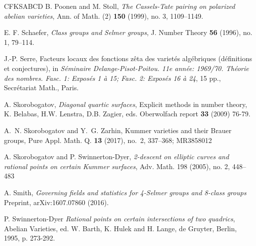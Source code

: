 \documentclass[10pt]{amsart}
\numberwithin{equation}{section}
\theoremstyle{remark}
\theoremstyle{definition}
\theoremstyle{definition}
\theoremstyle{definition}
\theoremstyle{definition}
\theoremstyle{definition}
\theoremstyle{definition}
\theoremstyle{definition}
\theoremstyle{definition}
\begin{document}
\begin{thebibliography}{CFKSABCD}
  B. Poonen and M. Stoll,  \textit{The {C}assels-{T}ate pairing on polarized abelian varieties}, Ann. of Math. (2) \textbf{150} (1999), no. 3, 1109--1149.
  
E. F. Schaefer, \textit{Class groups and {S}elmer groups}, J. Number Theory \textbf{56} (1996), no. 1, 79--114.

 J.-P. Serre, Facteurs locaux des fonctions z\^eta des variet\'es alg\'ebriques (d\'efinitions et conjectures), in {\it S\'eminaire Delange-Pisot-Poitou. 11e ann\'ee: 1969/70. Th\'eorie des nombres. Fasc. 1: Expos\'es 1 \`a{} 15; Fasc. 2: Expos\'es 16 \`a{} 24}, 15 pp., Secr\'etariat Math., Paris.
  
A.  Skorobogatov, \textit{Diagonal quartic surfaces}, Explicit methods in number theory, K. Belabas, H.W. Lenstra, D.B. Zagier, eds. Oberwolfach report \textbf{33} (2009) 76-79. 

 A.~N. Skorobogatov and Y.~G. Zarhin, Kummer varieties and their Brauer groups, Pure Appl. Math. Q. {\bf 13} (2017), no.~2, 337--368; MR3858012
  
A.  Skorobogatov and P.  Swinnerton-Dyer, \textit{2-descent on elliptic curves and rational points on certain Kummer surfaces}, Adv. Math. 198 (2005), no. 2, 448–483
  

 
  
A. Smith, \textit{Governing fields and statistics for 4-Selmer groups and 8-class groups}
  Preprint, arXiv:1607.07860 (2016).  
  
  
  
P. Swinnerton-Dyer   \textit{Rational points on certain intersections of two quadrics}, Abelian Varieties, ed. W. Barth, K. Hulek and H. Lange, de Gruyter, Berlin, 1995, p. 273-292. 
  

\end{thebibliography}
\end{document}
